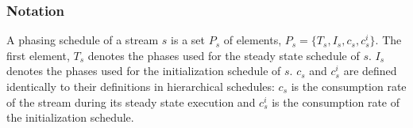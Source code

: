 \begin{comment}
A minimal latency schedule is not necessarily single
appearance. In fact, very few applications can have their minimal
latency schedules expressed as a single appearance schedule.  One
of the consequences of this is that minimal latency schedules
require more space for storage of the schedule. Use of phasing
scheduling facilitates creation of acceptably small minimal
latency schedules.  In spirit of hierarchical scheduling, every
component is scheduled separately, in hierarchical order.

One important consequence of phased scheduling, one that is
highlighted when calculating a minimal latency schedule, is that
every phase is allowed to consume a different amount of data and
produce a different amount of data.

\subsubsection{Peeking}

Phased scheduling has interesting consequence for peeking
calculations.  The reason for this is that not all phases must
consume data, thus not all phases will peek.  The amount of
peeking done by a stream is important for creating an
initialization schedule.  It is thus important to remember that
the amount of peeking done by a stream is not necessarily the
amount of peeking done by that stream in its first phase, because
on first phase, the stream may not consume or peek any data.
\end{comment}

\subsubsection{Notation}

\begin{comment}
We extend the notation for peeking, popping and pushing to
include phases. $u^m_s$ will denote amount of data pushed by the
$m$th phase of stream $s$, $o^m_s$ will denote amount of data
popped by the $m$th phase of stream $s$ and $e^m_s$ will denote
amount of data peeked by $m$th phase of stream $s$.
\end{comment}

A phasing schedule of a stream $s$ is a set $P_s$ of elements,
$P_s = \{T_s, I_s, c_s, c^i_s\}$.  The first element, $T_s$
denotes the phases used for the steady state schedule of $s$.
$I_s$ denotes the phases used for the initialization schedule of
$s$. $c_s$ and $c^i_s$ are defined identically to their
definitions in hierarchical schedules: $c_s$ is the consumption
rate of the stream during its steady state execution and $c^i_s$
is the consumption rate of the initialization schedule.


